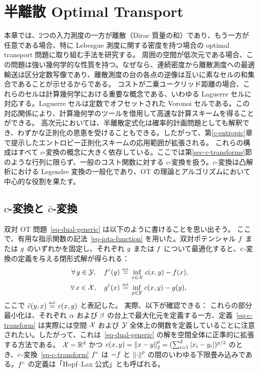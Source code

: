 \chapter{半離散 Optimal Transport}
\label{c-algo-semidiscr}

本章では、2つの入力測度の一方が離散（Dirac 質量の和）であり、もう一方が任意である場合、特に Lebesgue 測度に関する密度を持つ場合の optimal transport 問題に取り組む手法を研究する。
周囲の空間が低次元である場合、この問題は強い幾何学的な性質を持つ。なぜなら、連続密度から離散測度への最適輸送は区分定数写像であり、離散測度の台の各点の逆像は互いに素なセルの和集合であることが示せるからである。
コストが二乗ユークリッド距離の場合、これらのセルは計算幾何学における重要な概念である、いわゆる Laguerre セルに対応する。Laguerre セルは定数でオフセットされた Voronoi セルである。この対応関係により、計算幾何学のツールを借用して高速な計算スキームを得ることができる。
高次元においては、半離散定式化は確率的計画問題としても解釈でき、わずかな正則化の恩恵を受けることもできる。したがって、第\ref{c-entropic}章で提示したエントロピー正則化スキームの応用範囲が拡張される。
これらの構成はすべて $c$-変換の概念に大きく依存している。ここでは第\ref{sec-c-transforms}節のような行列に限らず、一般のコスト関数に対する $c$-変換を扱う。$c$-変換は凸解析における Legendre 変換の一般化であり、OT の理論とアルゴリズムにおいて中心的な役割を果たす。

\section{$c$-変換と $\bar c$-変換}
\label{s-c-transform}

双対 OT 問題~\eqref{eq-dual-generic} は以下のように書けることを思い出そう。
ここで、有用な指示関数の記法~\eqref{eq-iota-function} を用いた。双対ポテンシャル $f$ または $g$ のいずれかを固定し、それぞれ $g$ または $f$ について最適化すると、$c$-変換の定義を与える閉形式解が得られる：
\begin{align}\label{eq-c-transform}
	\forall \, y \in \mathcal{Y}, \quad
	f^c(y) &\stackrel{\mbox{\upshape\tiny def.}}{=} \underset{x \in \mathcal{X}}{\inf}\; c(x,y) - f(x), \\
	\forall \, x \in \mathcal{X}, \quad
	g^{\bar{c}}(x) &\stackrel{\mbox{\upshape\tiny def.}}{=} \underset{y \in \mathcal{Y}}{\inf}\; c(x,y) - g(y),
\end{align}
ここで $\bar{c}(y,x) \stackrel{\mbox{\upshape\tiny def.}}{=} c(x,y)$ と表記した。
実際、以下が確認できる：
これらの部分最小化は、それぞれ $\alpha$ および $\beta$ の台上で最大化元を定義する一方、定義~\eqref{eq-c-transform} は実際には空間 $\mathcal{X}$ および $\mathcal{Y}$ 全体上の関数を定義していることに注意されたい。したがって、これは~\eqref{eq-dual-generic} の解を空間全体に正準的に拡張する方法である。
$\mathcal{X}=\mathbb{R}^d$ かつ $c(x,y)=\left\| x-y \right\|_2^p=(\sum_{i=1}^d \left\lvert x_i-y_i\right\rvert)^{p/2}$ のとき、$c$-変換~\eqref{eq-c-transform} $f^c$ は $-f$ と $\left\| \cdot \right\|^p$ の間のいわゆる下限畳み込みである。$f^c$ の定義は「Hopf--Lax 公式」とも呼ばれる。


